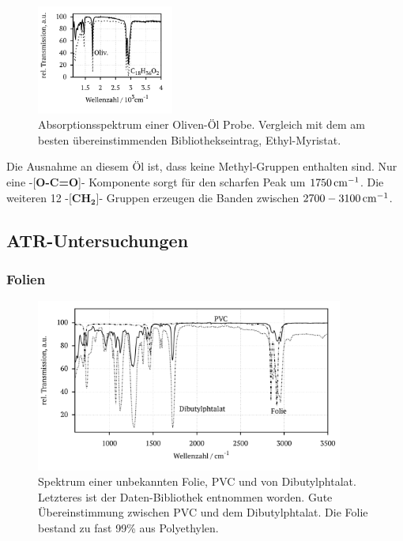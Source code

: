 \documentclass[a4paper,10pt,twocolumn]{article}
\newcommand{\fett}[1]{\textbf{#1}}
\begin{document}
			\begin{figure}[h]
			\centering
				\includegraphics[width=0.4\textwidth]{Gruppe2A/oliven.pdf}
				\caption{Absorptionsspektrum einer Oliven-\"Ol Probe. Vergleich mit dem am besten \"ubereinstimmenden Bibliothekseintrag, Ethyl-Myristat.}
				\label{img:oliven}
			\end{figure}

		Die Ausnahme an diesem \"Ol ist, dass keine Methyl-Gruppen enthalten sind. Nur eine -[\fett{O-C=O}]- Komponente sorgt f\"ur den scharfen Peak um $\unit[1750]{cm^{-1}}$. Die weiteren 12 -[\fett{CH}$_{\fett{2}}$]- Gruppen erzeugen die Banden zwischen $\unit[2700-3100]{cm^{-1}}$.
		
		\subsection{ATR-Untersuchungen}
		
		\subsubsection{Folien}

			\begin{figure}
			\centering
				\includegraphics[width=0.9\textwidth]{Gruppe2A/folien.pdf}
				\caption{Spektrum einer unbekannten Folie, PVC und von Dibutylphtalat. Letzteres ist der Daten-Bibliothek entnommen worden. Gute \"Ubereinstimmung zwischen PVC und dem Dibutylphtalat. Die Folie bestand zu fast 99\% aus Polyethylen.} 
				\label{img:folien}
			\end{figure}
			
\end{document}
